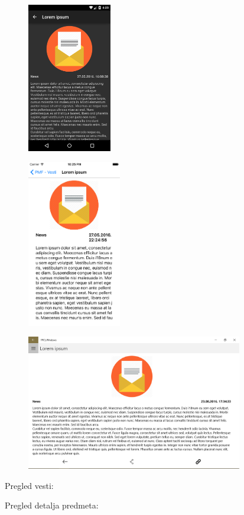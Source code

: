 \documentclass[a4paper]{article}
\begin{document}
\begin{figure}
\centering
\includegraphics[width=36.76mm,height=65.3mm]{msc-img19.png}
\end{figure}
\begin{figure}
\centering
\includegraphics[width=41.08mm,height=73.06mm]{msc-img20.png}
\end{figure}
\begin{figure}
\centering
\includegraphics[width=94.37mm,height=58.97mm]{msc-img21.png}
\end{figure}
Pregled vesti:

\clearpage
Pregled detalja predmeta:
\end{document}
